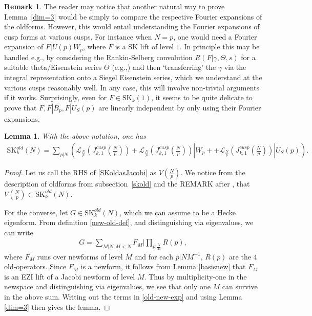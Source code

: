 \documentclass[11pt]{amsart}
\numberwithin{equation}{section}
\theoremstyle{plain}
\newtheorem{lem}[thm]{Lemma}
\theoremstyle{definition}
\newtheorem{rmk}[thm]{Remark}
\newcommand{\lemref}[1]{Lemma~\ref{#1}}
\newcommand{\mc}{\mathcal}
\newcommand{\mrm}{\mathrm}
\newcommand{\sumn}{\sum \nolimits}
\newcommand{\skk}{\mrm{SK}_k}
\begin{document}
\begin{rmk} \label{mp-not-fe}
    The reader may notice that another natural way to prove \lemref{dim=3} would be simply to compare the respective
    Fourier expansions of the oldforms. However, this would entail understanding the Fourier expansions of cusp forms at various cusps. For instance when $N=p$, one would need a Fourier expansion of $F|U(p)W_p$, where $F$ is a SK lift of level $1$. In principle this may be handled e.g., by considering the Rankin-Selberg convolution $R(F|\gamma, \Theta,s)$ for a suitable theta/Eisenstein series $\Theta$ (e.g.,) and then `transferring' the $\gamma$ via the integral representation onto a Siegel Eisenstein series, which we understand at the various cusps reasonably well. In any case, this will involve non-trivial arguments if it works. Surprisingly, even for $F \in \skk(1)$, it seems to be quite delicate to prove that $F, F|B_p, F|U_S(p)$ are linearly independent by only using their Fourier expansions.
\end{rmk}

\begin{lem} \label{same-old}
 With the above notation, one has 
    \begin{align}\label{SKoldasJacobi}
    \skk^{old}(N) = \sumn_{p|N} \left( \mc L_{\frac{N}{p}}(J_{k,1}^{cusp}(\frac{N}{p})) + \mc L_{\frac{N}{p}}(J_{k,1}^{cusp}(\frac{N}{p})) | W_p + + \mc L_{\frac{N}{p}}(J_{k,1}^{cusp}(\frac{N}{p})) | U_S(p) \right) .
    \end{align}
\end{lem}

\begin{proof}
Let us call the RHS of \eqref{SKoldasJacobi} as $V(\frac{N}{p})$.
    We notice from the description of oldforms from subsection~\ref{skold} and the REMARK after \cite[Theorem~4.1]{Ibu-SK}, that $V(\frac{N}{p}) \subset \skk^{old}(N)$.

For the converse, let $G \in \skk^{old}(N)$, which we can assume to be a Hecke eigenform. From definition \eqref{new-old-def}, and distinguishing via eigenvalues, we can write 
\begin{align} \label{old-new-exp}
    G= \sumn_{M|N, M<N} F_M |\prod \nolimits_{p|\frac{N}{M}} R(p),
\end{align}
where $F_M$  runs over newforms of level $M$ and for each $p|NM^{-1}$, $R(p)$ are the $4$ old-operators. 
Since $F_M$ is a newform, it follows from Lemma \ref{basisnew}  that $F_M$ is an EZI lift of a Jacobi newform of level $M$. Thus by multiplicity-one in the newspace and distinguishing via eigenvalues, we see that only one $M$ can survive in the above sum.  Writing out the terms in \eqref{old-new-exp} and using Lemma \ref{dim=3}
then gives the lemma.
\end{proof}
\end{document}
